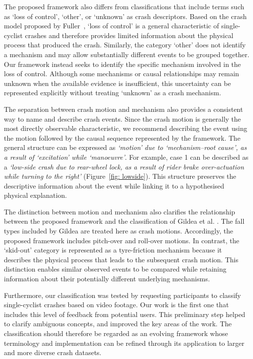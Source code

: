 \documentclass{article}
\begin{document}
The proposed framework also differs from classifications that include terms such as `loss of control', `other', or `unknown' as crash descriptors.
%
Based on the crash model proposed by Fuller~\cite{Ful05}, `loss of control' is a general characteristic of single-cyclist crashes and therefore provides limited information about the physical process that produced the crash.
%
Similarly, the category `other' does not identify a mechanism and may allow substantially different events to be grouped together.
%
Our framework instead seeks to identify the specific mechanism involved in the loss of control.
%
Although some mechanisms or causal relationships may remain unknown when the available evidence is insufficient, this uncertainty can be represented explicitly without treating `unknown' as a crash mechanism.


The separation between crash motion and mechanism also provides a consistent way to name and describe crash events.
%
Since the crash motion is generally the most directly observable characteristic, we recommend describing the event using the motion followed by the causal sequence represented by the framework.
%
The general structure can be expressed as \textit{`motion' due to `mechanism--root cause', as a result of `excitation' while `manoeuvre'}.
%
For example, case 1 can be described as a \textit{`low-side crash due to rear-wheel lock, as a result of rider brake over-actuation while turning to the right'} (Figure~\ref{fig: lowside}).
%
This structure preserves the descriptive information about the event while linking it to a hypothesised physical explanation.


The distinction between motion and mechanism also clarifies the relationship between the proposed framework and the classification of Gildea et al. \cite{Gil21}.
%
The fall types included by Gildea are treated here as crash motions.
%
Accordingly, the proposed framework includes pitch-over and roll-over motions.
%
In contrast, the `skid-out' category is represented as a tyre-friction mechanism because it describes the physical process that leads to the subsequent crash motion.
%
This distinction enables similar observed events to be compared while retaining information about their potentially different underlying mechanisms.


Furthermore, our classification was tested by requesting participants to classify single-cyclist crashes based on video footage.
%
Our work is the first one that includes this level of feedback from potential users.
%
This preliminary step helped to clarify ambiguous concepts, and improved the key areas of the work.
%
The classification should therefore be regarded as an evolving framework whose terminology and implementation can be refined through its application to larger and more diverse crash datasets.
\end{document}
